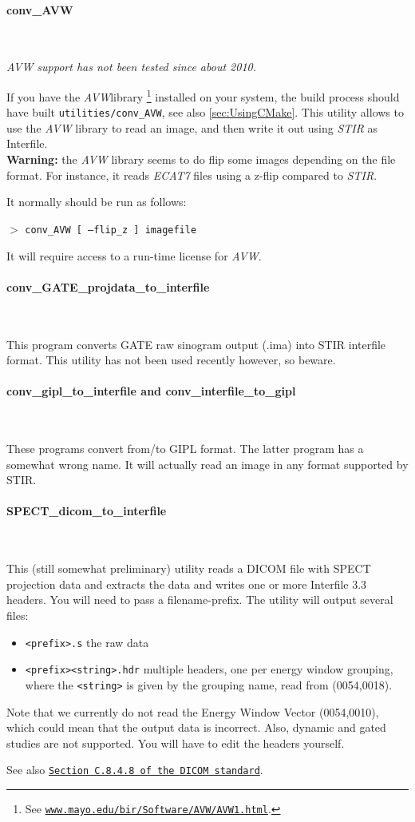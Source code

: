 \documentclass{article}
\def\url#1#2{\mbox{\href{#1}{\tt #2}}}
\newcommand{\subsubsubsection}[1]{\paragraph{#1}\mbox{} \\}
\newcommand{\cmdline}[1]{\par \noindent $>$ \texttt{#1}\par}
\begin{document}
{{{ \subsubsubsection{conv\_AVW}
}
\label{sec:convAVW}
\textit{AVW support has not been tested since about 2010.}

If you have the \textit{AVW}\texttrademark  library
\footnote{See \url{http://www.mayo.edu/bir/Software/AVW/AVW1.html}
{www.mayo.edu/bir/Software/AVW/AVW1.html}.
} installed on your system, the build process should have built \texttt{utilities/conv\_AVW},
see also \ref{sec:UsingCMake}.
This utility allows to use the \textit{AVW} library to read an image, and then write it out
using \textit{STIR} as Interfile.\\
\textbf{Warning:} the \textit{AVW} library seems to do flip some images depending
on the file format. For instance, it reads \textit{ECAT7} files using a z-flip compared
to \textit{STIR}.

It normally should be run as follows:
\cmdline{conv\_AVW [ --flip\_z ] imagefile}

It will require access to a run-time license for \textit{AVW}.

{ \subsubsubsection{conv\_GATE\_projdata\_to\_interfile}
}
This program converts GATE raw sinogram output (.ima) into STIR interfile format. This utility
has not been used recently however, so beware.

{ \subsubsubsection{conv\_gipl\_to\_interfile and conv\_interfile\_to\_gipl}
}
These programs convert from/to GIPL format. The latter program has a somewhat wrong name.
It will actually read an image in any format supported by STIR.

{ \subsubsubsection{SPECT\_dicom\_to\_interfile}\label{utility:SPECT_dicom_to_interfile}}
This (still somewhat preliminary) utility reads a DICOM file with SPECT projection data and extracts the data and writes one or more Interfile 3.3
headers. You will need to pass a filename-prefix. The utility will output several files:
\begin{itemize}
\item \texttt{<prefix>.s} the raw data
\item \texttt{<prefix><string>.hdr} multiple headers, one per energy window grouping, where the \texttt{<string>} is given by the grouping name, read from (0054,0018).
\end{itemize}
Note that we currently do not read the Energy Window Vector (0054,0010), which could mean that the output data is incorrect.
Also, dynamic and gated studies are not supported. You will have to edit the headers yourself.

See also \url{https://dicom.nema.org/medical/dicom/current/output/chtml/part03/sect_C.8.4.8.html}{Section C.8.4.8 of the DICOM standard}.

}}
\end{document}
